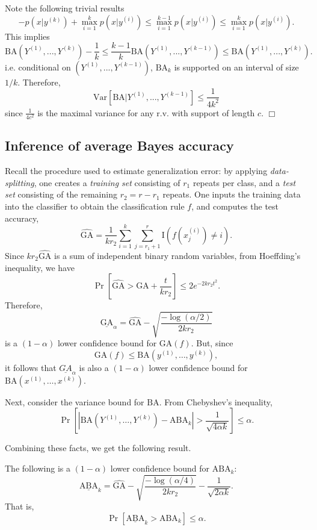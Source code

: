 Note the following trivial results
\[
-p(x|y^{(k)}) + \max_{i=1}^k p(x|y^{(i)})\leq \max_{i=1}^{k-1} p(x|y^{(i)}) \leq \max_{i=1}^k p(x|y^{(i)}).
\]
This implies
\[
\text{BA}(Y^{(1)},...,Y^{(k)}) - \frac{1}{k} \leq \frac{k-1}{k}\text{BA}(Y^{(1)},...,Y^{(k-1)}) \leq \text{BA}(Y^{(1)},...,Y^{(k)}).
\]
i.e. conditional on $(Y^{(1)},...,Y^{(k-1)})$, $\text{BA}_k$ is supported on an interval of size $1/k$.
Therefore,
\[
\text{Var}[\text{BA}|Y^{(1)},...,Y^{(k-1)}] \leq \frac{1}{4k^2}
\]
since $\frac{1}{4c^2}$ is the maximal variance for any r.v. with support of length $c$. $\Box$

\subsection{Inference of average Bayes accuracy}

Recall the procedure used to estimate generalization error: by
applying \emph{data-splitting}, one creates a \emph{training set}
consisting of $r_1$ repeats per class, and a \emph{test set}
consisting of the remaining $r_2 = r - r_1$ repeats.  One inputs the
training data into the classifier to obtain the classification rule
$f$, and computes the test accuracy,
\[
\widehat{\text{GA}} = \frac{1}{k r_2} \sum_{i=1}^k \sum_{j = r_1 + 1}^r \text{I}(f(x_j^{(i)}) \neq i).
\]
Since $kr_2 \widehat{\text{GA}}$ is a sum of independent binary random
variables, from Hoeffding's inequality, we have
\[
\Pr[\widehat{\text{GA}} > \text{GA} + \frac{t}{kr_2}] \leq 2e^{-2kr_2t^2}.
\]
Therefore,
\[
\underline{\text{GA}}_\alpha = \widehat{\text{GA}} - \sqrt{\frac{-\log(\alpha/2)}{2kr_2}}
\]
is a $(1-\alpha)$ lower confidence bound for $\text{GA}(f)$.
But, since
\[
\text{GA}(f) \leq \text{BA}(y^{(1)},\hdots, y^{(k)}),
\]
it follows that $\underline{GA}_\alpha$ is also a $(1-\alpha)$ lower confidence bound for $\text{BA}(x^{(1)},\hdots, x^{(k)})$.

Next, consider the variance bound for $\text{BA}$.  From Chebyshev's inequality,
\[
\Pr[|\text{BA}(Y^{(1)},\hdots, Y^{(k)}) - \text{ABA}_k| > \frac{1}{\sqrt{4\alpha k}}] \leq \alpha.
\]

Combining these facts, we get the following result.

\begin{theorem}
The following is a $(1-\alpha)$ lower confidence bound for $\text{ABA}_k$:
\[
\underline{\text{ABA}}_k = \widehat{\text{GA}} - \sqrt{\frac{-\log(\alpha/4)}{2kr_2}} - \frac{1}{\sqrt{2\alpha k}}.
\]
That is, 
\[
\Pr[\underline{\text{ABA}}_k > \text{ABA}_k] \leq \alpha.
\]
\end{theorem}

